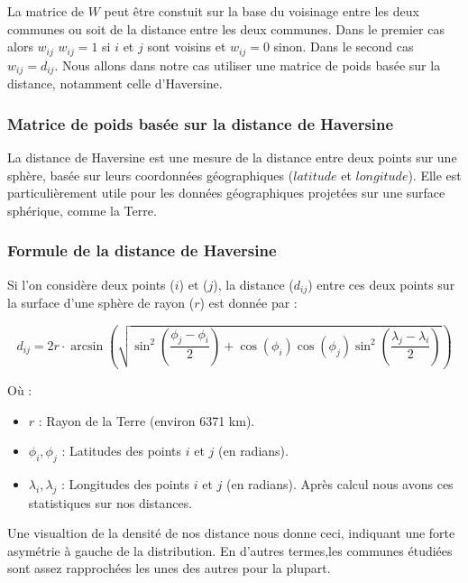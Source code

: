 \documentclass[
]{article}
\begin{document}
La matrice de \(W\) peut être constuit sur la base du voisinage entre
les deux communes ou soit de la distance entre les deux communes. Dans
le premier cas alors \(w_{ij}\) \(w_{ij} = 1\) si \(i\) et \(j\) sont
voisins et \(w_{ij} = 0\) sinon. Dans le second cas \(w_{ij} = d_{ij}\).
Nous allons dans notre cas utiliser une matrice de poids basée sur la
distance, notamment celle d'Haversine.

\subsubsection{Matrice de poids basée sur la distance de
Haversine}\label{matrice-de-poids-basuxe9e-sur-la-distance-de-haversine}

La distance de Haversine est une mesure de la distance entre deux points
sur une sphère, basée sur leurs coordonnées géographiques (\(latitude\)
et \(longitude\)). Elle est particulièrement utile pour les données
géographiques projetées sur une surface sphérique, comme la Terre.

\subsubsection{Formule de la distance de
Haversine}\label{formule-de-la-distance-de-haversine}

Si l'on considère deux points (\(i\)) et (\(j\)), la distance
(\(d_{ij}\)) entre ces deux points sur la surface d'une sphère de rayon
(\(r\)) est donnée par :

\[
 d_{ij} = 2r \cdot \arcsin\left(\sqrt{\sin^2\left(\frac{\phi_j - \phi_i}{2}\right) + \cos(\phi_i)\cos(\phi_j)\sin^2\left(\frac{\lambda_j - \lambda_i}{2}\right)}\right)
\]

Où :

\begin{itemize}
\item
  \(r\) : Rayon de la Terre (environ 6371 km).
\item
  \(\phi_i, \phi_j\) : Latitudes des points \(i\) et \(j\) (en radians).
\item
  \(\lambda_i, \lambda_j\) : Longitudes des points \(i\) et \(j\) (en
  radians). Après calcul nous avons ces statistiques sur nos distances.
\end{itemize}

Une visualtion de la densité de nos distance nous donne ceci, indiquant
une forte asymétrie à gauche de la distribution. En d'autres termes,les
communes étudiées sont assez rapprochées les unes des autres pour la
plupart.
\end{document}
